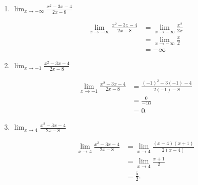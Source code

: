 \documentclass{article}
\begin{document}
\begin{enumerate}
\begin{enumerate}
\begin{enumerate}
    \item

      \begin{problem}[\vfill]
        $\displaystyle \lim_{x \rightarrow -\infty} \frac{x^2 - 3x - 4}{2x - 8}$
      \end{problem}

      \begin{solution}
        \begin{align*}
          \lim_{x \to -\infty} \frac{x^2 - 3x - 4}{2x - 8} &= \lim_{x \to -\infty} \frac{x^2}{2x} \\
          &= \lim_{x \to -\infty} \frac{x}{2} \\
          &= -\infty
        \end{align*}
      \end{solution}

    \item

      \begin{problem}[\vfill]
        $\displaystyle \lim_{x \rightarrow -1} \frac{x^2 - 3x - 4}{2x - 8}$
      \end{problem}

      \begin{solution}
        \begin{align*}
          \lim_{x \to -1} \frac{x^2 - 3x - 4}{2x - 8} &= \frac{(-1)^2 - 3(-1) - 4}{2(-1)-8}\\
          &= \frac{0}{-10} \\
          &= 0.
        \end{align*}
      \end{solution}

    \item

      \begin{problem}[\vfill]
        $\displaystyle \lim_{x \rightarrow 4} \frac{x^2 - 3x - 4}{2x - 8}$
      \end{problem}

      \begin{solution}
        \begin{align*}
            \lim_{x \to 4} \frac{x^2 - 3x - 4}{2x - 8} 
            &= \lim_{x \to 4} \frac{(x-4)(x+1)}{2(x-4)} \\
          &= \lim_{x \to 4} \frac{x+1}{2} \\
          &= \frac{5}{2}.
        \end{align*}
      \end{solution}
    \end{enumerate}


\end{enumerate}
\end{enumerate}
\end{document}
